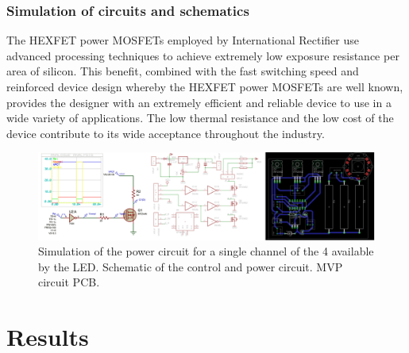 \documentclass[letterpaper,12pt,twoside]{articleingud}
\begin{document}
\subsubsection{Simulation of circuits and schematics}
The HEXFET power MOSFETs employed by International Rectifier use advanced processing techniques to achieve extremely low exposure resistance per area of silicon. This benefit, combined with the fast switching speed and reinforced device design whereby the HEXFET power MOSFETs are well known, provides the designer with an extremely efficient and reliable device to use in a wide variety of applications. The low thermal resistance and the low cost of the device contribute to its wide acceptance throughout the industry.
\begin{figure}
 \begin{center}
  \includegraphics[width=16cm]{images/circuitoDriver.png}
   \caption{Simulation of the power circuit for a single channel of the 4 available by the LED. Schematic of the control and power circuit. MVP circuit PCB. \cite{wiki}} \end{center}
\end{figure}


\section{Results}
\end{document}
